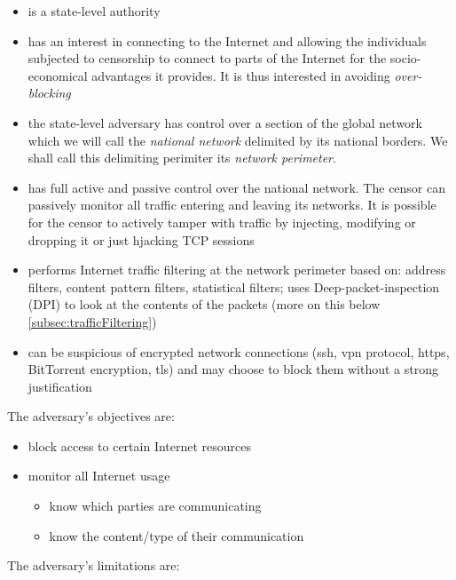 \documentclass[11pt]{article} %
\begin{document}
\begin{itemize}
\item is a state-level authority
\item has an interest in connecting to the Internet and allowing the individuals subjected to censorship to connect to parts of the Internet for the socio-economical advantages it provides. It is thus interested in avoiding \textit{over-blocking}
\item the state-level adversary has control over a section of the global network which we will call the \textit{national network} delimited by its national borders. We shall call this delimiting perimiter its \textit{network perimeter}.
\item has full active and passive control over the national network. The censor can passively monitor all traffic entering and leaving its networks. It is possible for the censor to actively tamper with traffic by injecting, modifying or dropping it or just hjacking TCP sessions
\item performs Internet traffic filtering at the network perimeter based on: address filters, content pattern filters, statistical filters; uses Deep-packet-inspection (DPI) to look at the contents of the packets (more on this below \ref{subsec:trafficFiltering})

\item can be suspicious of encrypted network connections (ssh, vpn protocol, https, BitTorrent encryption, tls) and may choose to block them without a strong justification

\end{itemize}

The adversary's objectives are:
\begin{itemize}
\item block access to certain Internet resources
\item monitor all Internet usage
\begin{itemize}
\item know which parties are communicating
\item know the content/type of their communication
\end{itemize}
\end{itemize}

The adversary's limitations are:
\end{document}
